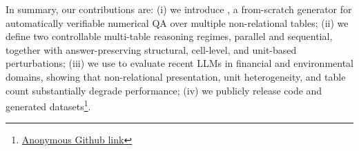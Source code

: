 
In summary, our contributions are:
(i) we introduce \name, a from-scratch generator for automatically verifiable numerical QA over multiple non-relational tables;
(ii) we define two controllable multi-table reasoning regimes, parallel and sequential, together with answer-preserving structural, cell-level, and unit-based perturbations;
(iii) we use \name to evaluate recent LLMs in financial and environmental domains, showing that non-relational presentation, unit heterogeneity, and table count substantially degrade performance; 
(iv) we publicly release code and generated datasets\footnote{\href{https://anonymous.4open.science/r/Gradino-DBF6/}{Anonymous Github link}}.
